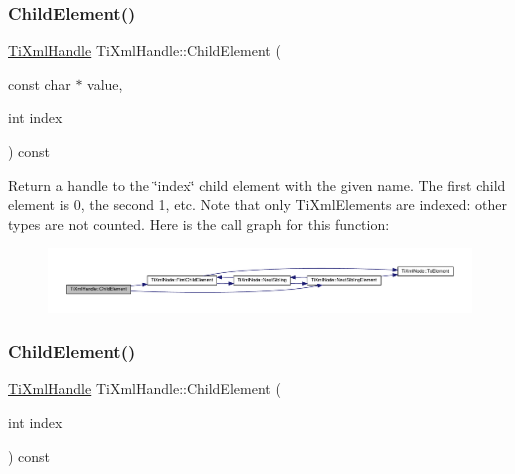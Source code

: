 \subsubsection{\texorpdfstring{Child\+Element()}{ChildElement()}\hspace{0.1cm}{\footnotesize\ttfamily [1/2]}}
{\footnotesize\ttfamily \hyperlink{classTiXmlHandle}{Ti\+Xml\+Handle} Ti\+Xml\+Handle\+::\+Child\+Element (\begin{DoxyParamCaption}\item[{const char $\ast$}]{value,  }\item[{int}]{index }\end{DoxyParamCaption}) const}

Return a handle to the \char`\"{}index\char`\"{} child element with the given name. The first child element is 0, the second 1, etc. Note that only Ti\+Xml\+Elements are indexed\+: other types are not counted. Here is the call graph for this function\+:
\nopagebreak
\begin{figure}[H]
\begin{center}
\leavevmode
\includegraphics[width=350pt]{classTiXmlHandle_afccc59d8a0daa8c5d78474fbed430ddb_cgraph}
\end{center}
\end{figure}
\mbox{\label{classTiXmlHandle_a57a639ab0ac99ff9358f675a1b73049a}} 
\subsubsection{\texorpdfstring{Child\+Element()}{ChildElement()}\hspace{0.1cm}{\footnotesize\ttfamily [2/2]}}
{\footnotesize\ttfamily \hyperlink{classTiXmlHandle}{Ti\+Xml\+Handle} Ti\+Xml\+Handle\+::\+Child\+Element (\begin{DoxyParamCaption}\item[{int}]{index }\end{DoxyParamCaption}) const}

